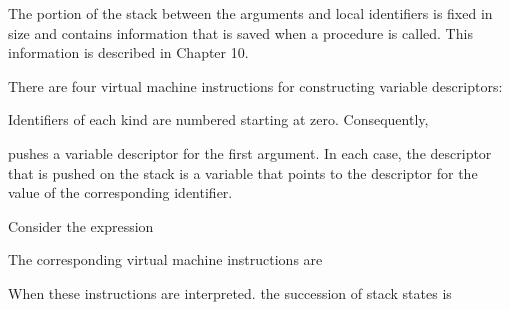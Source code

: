 
The portion of the stack between the arguments and local identifiers
is fixed in size and contains information that is saved when a
procedure is called. This information is described in Chapter 10.

There are four virtual machine instructions for constructing variable
descriptors:

\goodbreak
{}

Identifiers of each kind are numbered starting at zero. Consequently,


\noindent pushes a variable descriptor for the first argument. In each
case, the descriptor that is pushed on the stack is a variable that
points to the descriptor for the value of the corresponding identifier.

Consider the expression


The corresponding virtual machine instructions are

\goodbreak
{}

When these instructions are interpreted. the succession of stack states is

